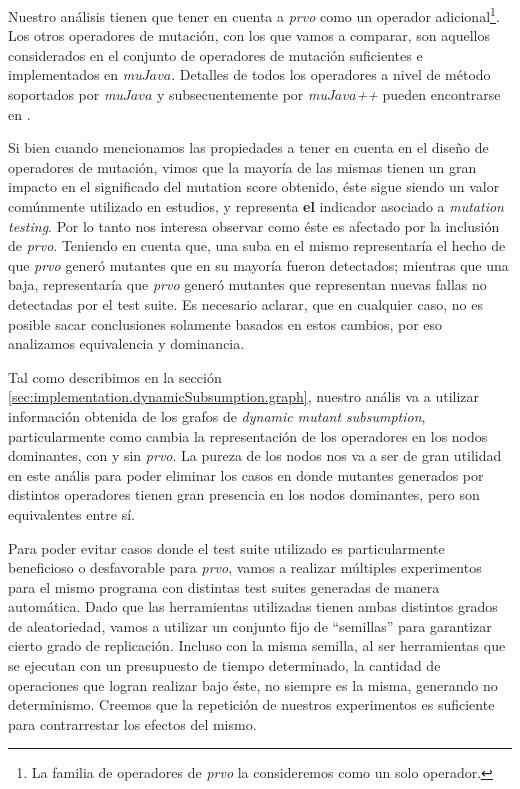 Nuestro an\'alisis tienen que tener en cuenta a \emph{prvo} como un operador adicional\footnote{La familia de operadores de \emph{prvo} la consideremos como un solo operador.}. Los otros operadores de mutaci\'on, con los que vamos a comparar, son aquellos considerados en el conjunto de operadores de mutaci\'on suficientes \cite{bibliography.mutation.selection.Offutt96, bibliography.mutation.selection.ASN2008} e implementados en \emph{mu$Java$}. Detalles de todos los operadores a nivel de m\'etodo soportados por \emph{mu$Java$} y subsecuentemente por \emph{mu$Java$++} pueden encontrarse en \cite{muJavaMOPS}. 

Si bien cuando mencionamos las propiedades a tener en cuenta en el dise\~no de operadores de mutaci\'on, vimos que la mayor\'ia de las mismas tienen un gran impacto en el significado del mutation score obtenido, \'este sigue siendo un valor com\'unmente utilizado en estudios, y representa \textbf{el} indicador asociado a \emph{mutation testing}. Por lo tanto nos interesa observar como \'este es afectado por la inclusi\'on de \emph{prvo}. Teniendo en cuenta que, una suba en el mismo representar\'ia el hecho de que \emph{prvo} gener\'o mutantes que en su mayor\'ia fueron detectados; mientras que una baja, representar\'ia que \emph{prvo} gener\'o mutantes que representan nuevas fallas no detectadas por el test suite. Es necesario aclarar, que en cualquier caso, no es posible sacar conclusiones solamente basados en estos cambios, por eso analizamos equivalencia y dominancia.

Tal como describimos en la secci\'on \ref{sec:implementation.dynamicSubsumption.graph}, nuestro an\'alis va a utilizar informaci\'on obtenida de los grafos de \emph{dynamic mutant subsumption}, particularmente como cambia la representaci\'on de los operadores en los nodos dominantes, con y sin \emph{prvo}. La pureza de los nodos nos va a ser de gran utilidad en este an\'alis para poder eliminar los casos en donde mutantes generados por distintos operadores tienen gran presencia en los nodos dominantes, pero son equivalentes entre s\'i.

Para poder evitar casos donde el test suite utilizado es particularmente beneficioso o desfavorable para \emph{prvo}, vamos a realizar m\'ultiples experimentos para el mismo programa con distintas test suites generadas de manera autom\'atica. Dado que las herramientas utilizadas tienen ambas distintos grados de aleatoriedad, vamos a utilizar un conjunto fijo de ``semillas'' para garantizar cierto grado de replicaci\'on. Incluso con la misma semilla, al ser herramientas que se ejecutan con un presupuesto de tiempo determinado, la cantidad de operaciones que logran realizar bajo \'este, no siempre es la misma, generando no determinismo. Creemos que la repetici\'on de nuestros experimentos es suficiente para contrarrestar los efectos del mismo.

